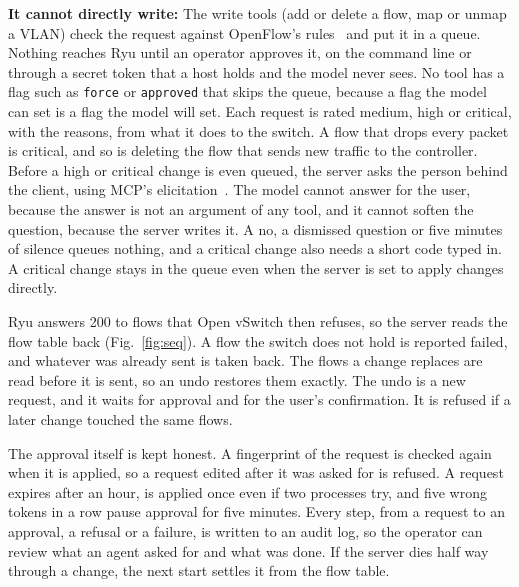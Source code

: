 \documentclass[10pt,letterpaper]{article}
\begin{document}
\textbf{It cannot directly write:} The write tools (add or delete a flow, map or unmap a VLAN) check the request against OpenFlow's rules~\cite{of13} and put it in a queue. Nothing reaches Ryu until an operator approves it, on the command line or through a secret token that a host holds and the model never sees. No tool has a flag such as \texttt{force} or \texttt{approved} that skips the queue, because a flag the model can set is a flag the model will set.
 Each request is rated medium, high or critical, with the reasons, from what it does to the switch. A flow that drops every packet is critical, and so is deleting the flow that sends new traffic to the controller. Before a high or critical change is even queued, the server asks the person behind the client, using MCP's elicitation~\cite{elicit}. The model cannot answer for the user, because the answer is not an argument of any tool, and it cannot soften the question, because the server writes it. A no, a dismissed question or five minutes of silence queues nothing, and a critical change also needs a short code typed in. A critical change stays in the queue even when the server is set to apply changes directly.

Ryu answers 200 to flows that Open vSwitch then refuses, so the server reads the flow table back (Fig.~\ref{fig:seq}). A flow the switch does not hold is reported failed, and whatever was already sent is taken back. The flows a change replaces are read before it is sent, so an undo restores them exactly. The undo is a new request, and it waits for approval and for the user's confirmation. It is refused if a later change touched the same flows.

The approval itself is kept honest. A fingerprint of the request is checked again when it is applied, so a request edited after it was asked for is refused. A request expires after an hour, is applied once even if two processes try, and five wrong tokens in a row pause approval for five minutes. Every step, from a request to an approval, a refusal or a failure, is written to an audit log, so the operator can review what an agent asked for and what was done. If the server dies half way through a change, the next start settles it from the flow table.
\end{document}

